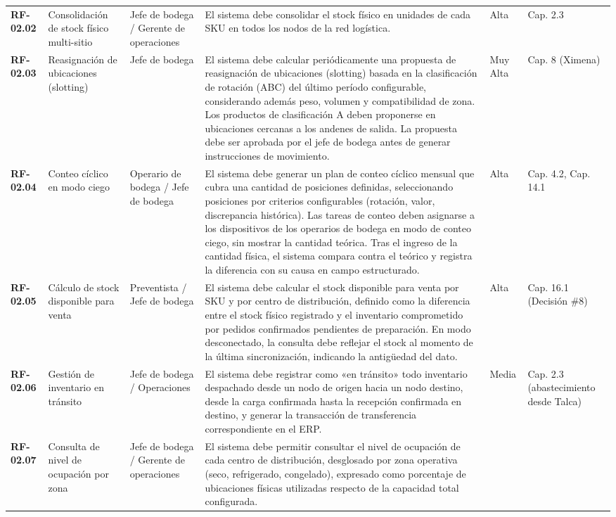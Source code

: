 \begin{longtable}{p{1.7cm} p{2.3cm} p{1.9cm} p{5.0cm} p{1.1cm} p{1.9cm}}
\textbf{RF-02.02} & Consolidación de stock físico multi-sitio & Jefe de bodega / Gerente de operaciones & El sistema debe consolidar el stock físico en unidades de cada SKU en todos los nodos de la red logística. & Alta & Cap. 2.3 \\
\textbf{RF-02.03} & Reasignación de ubicaciones (slotting) & Jefe de bodega & El sistema debe calcular periódicamente una propuesta de reasignación de ubicaciones (slotting) basada en la clasificación de rotación (ABC) del último período configurable, considerando además peso, volumen y compatibilidad de zona. Los productos de clasificación A deben proponerse en ubicaciones cercanas a los andenes de salida. La propuesta debe ser aprobada por el jefe de bodega antes de generar instrucciones de movimiento. & Muy Alta & Cap. 8 (Ximena) \\
\textbf{RF-02.04} & Conteo cíclico en modo ciego & Operario de bodega / Jefe de bodega & El sistema debe generar un plan de conteo cíclico mensual que cubra una cantidad de posiciones definidas, seleccionando posiciones por criterios configurables (rotación, valor, discrepancia histórica). Las tareas de conteo deben asignarse a los dispositivos de los operarios de bodega en modo de conteo ciego, sin mostrar la cantidad teórica. Tras el ingreso de la cantidad física, el sistema compara contra el teórico y registra la diferencia con su causa en campo estructurado. & Alta & Cap. 4.2, Cap. 14.1 \\
\textbf{RF-02.05} & Cálculo de stock disponible para venta & Preventista / Jefe de bodega & El sistema debe calcular el stock disponible para venta por SKU y por centro de distribución, definido como la diferencia entre el stock físico registrado y el inventario comprometido por pedidos confirmados pendientes de preparación. En modo desconectado, la consulta debe reflejar el stock al momento de la última sincronización, indicando la antigüedad del dato. & Alta & Cap. 16.1 (Decisión \#8) \\
\textbf{RF-02.06} & Gestión de inventario en tránsito & Jefe de bodega / Operaciones & El sistema debe registrar como «en tránsito» todo inventario despachado desde un nodo de origen hacia un nodo destino, desde la carga confirmada hasta la recepción confirmada en destino, y generar la transacción de transferencia correspondiente en el ERP. & Media & Cap. 2.3 (abastecimiento desde Talca) \\
\textbf{RF-02.07} & Consulta de nivel de ocupación por zona & Jefe de bodega / Gerente de operaciones & El sistema debe permitir consultar el nivel de ocupación de cada centro de distribución, desglosado por zona operativa (seco, refrigerado, congelado), expresado como porcentaje de ubicaciones físicas utilizadas respecto de la capacidad total configurada. &  &  \\

\end{longtable}
